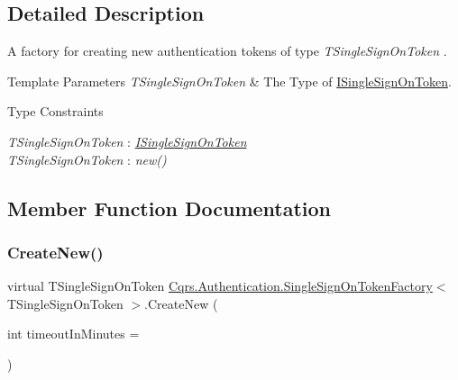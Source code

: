 \subsection{Detailed Description}
A factory for creating new authentication tokens of type {\itshape T\+Single\+Sign\+On\+Token} . 


\begin{DoxyTemplParams}{Template Parameters}
{\em T\+Single\+Sign\+On\+Token} & The Type of \hyperlink{interfaceCqrs_1_1Authentication_1_1ISingleSignOnToken}{I\+Single\+Sign\+On\+Token}.\\
\hline
\end{DoxyTemplParams}
\begin{Desc}
\item[Type Constraints]\begin{description}
\item[{\em T\+Single\+Sign\+On\+Token} : {\em \hyperlink{interfaceCqrs_1_1Authentication_1_1ISingleSignOnToken}{I\+Single\+Sign\+On\+Token}}]\item[{\em T\+Single\+Sign\+On\+Token} : {\em new()}]\end{description}
\end{Desc}


\subsection{Member Function Documentation}
\mbox{\label{classCqrs_1_1Authentication_1_1SingleSignOnTokenFactory_ab4d01a3600dbe9aa358cd93c98ccf281_ab4d01a3600dbe9aa358cd93c98ccf281}} 
\subsubsection{\texorpdfstring{Create\+New()}{CreateNew()}}
{\footnotesize\ttfamily virtual T\+Single\+Sign\+On\+Token \hyperlink{classCqrs_1_1Authentication_1_1SingleSignOnTokenFactory}{Cqrs.\+Authentication.\+Single\+Sign\+On\+Token\+Factory}$<$ T\+Single\+Sign\+On\+Token $>$.Create\+New (\begin{DoxyParamCaption}\item[{int}]{timeout\+In\+Minutes = {} }\end{DoxyParamCaption})\hspace{0.3cm}{\ttfamily [virtual]}}



